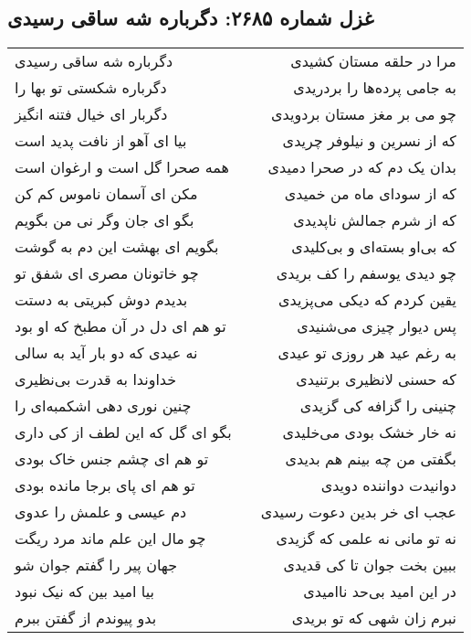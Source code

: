\begin{center}
\section*{غزل شماره ۲۶۸۵: دگرباره شه ساقی رسیدی}
\label{sec:2685}
\begin{longtable}{l p{0.5cm} r}
دگرباره شه ساقی رسیدی
&&
مرا در حلقه مستان کشیدی
\\
دگرباره شکستی تو بها را
&&
به جامی پرده‌ها را بردریدی
\\
دگربار ای خیال فتنه انگیز
&&
چو می بر مغز مستان بردویدی
\\
بیا ای آهو از نافت پدید است
&&
که از نسرین و نیلوفر چریدی
\\
همه صحرا گل است و ارغوان است
&&
بدان یک دم که در صحرا دمیدی
\\
مکن ای آسمان ناموس کم کن
&&
که از سودای ماه من خمیدی
\\
بگو ای جان وگر نی من بگویم
&&
که از شرم جمالش ناپدیدی
\\
بگویم ای بهشت این دم به گوشت
&&
که بی‌او بسته‌ای و بی‌کلیدی
\\
چو خاتونان مصری ای شفق تو
&&
چو دیدی یوسفم را کف بریدی
\\
بدیدم دوش کبریتی به دستت
&&
یقین کردم که دیکی می‌پزیدی
\\
تو هم ای دل در آن مطبخ که او بود
&&
پس دیوار چیزی می‌شنیدی
\\
نه عیدی که دو بار آید به سالی
&&
به رغم عید هر روزی تو عیدی
\\
خداوندا به قدرت بی‌نظیری
&&
که حسنی لانظیری برتنیدی
\\
چنین نوری دهی اشکمبه‌ای را
&&
چنینی را گزافه کی گزیدی
\\
بگو ای گل که این لطف از کی داری
&&
نه خار خشک بودی می‌خلیدی
\\
تو هم ای چشم جنس خاک بودی
&&
بگفتی من چه بینم هم بدیدی
\\
تو هم ای پای برجا مانده بودی
&&
دوانیدت دواننده دویدی
\\
دم عیسی و علمش را عدوی
&&
عجب ای خر بدین دعوت رسیدی
\\
چو مال این علم ماند مرد ریگت
&&
نه تو مانی نه علمی که گزیدی
\\
جهان پیر را گفتم جوان شو
&&
ببین بخت جوان تا کی قدیدی
\\
بیا امید بین که نیک نبود
&&
در این امید بی‌حد ناامیدی
\\
بدو پیوندم از گفتن ببرم
&&
نبرم زان شهی که تو بریدی
\\
\end{longtable}
\end{center}
